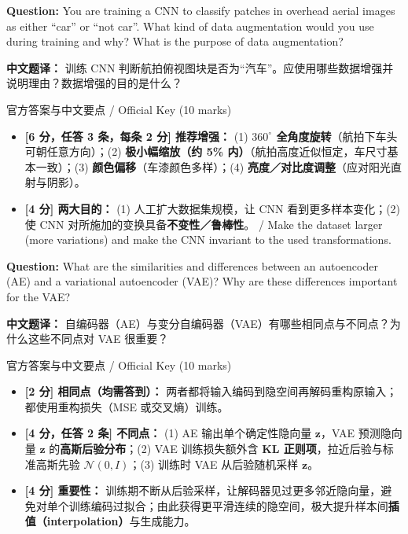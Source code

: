 \textbf{Question:} You are training a CNN to classify patches in overhead aerial images as either ``car'' or ``not car''. What kind of data augmentation would you use during training and why? What is the purpose of data augmentation?

\textbf{中文题译：} 训练 CNN 判断航拍俯视图块是否为“汽车”。应使用哪些数据增强并说明理由？数据增强的目的是什么？

\begin{StudySolution}{官方答案与中文要点 / Official Key (10 marks)}
\begin{itemize}
\item \textbf{[6 分，任答 3 条，每条 2 分] 推荐增强：} (1) \textbf{$360^\circ$ 全角度旋转}（航拍下车头可朝任意方向）；(2) \textbf{极小幅缩放（约 5\% 内）}（航拍高度近似恒定，车尺寸基本一致）；(3) \textbf{颜色偏移}（车漆颜色多样）；(4) \textbf{亮度／对比度调整}（应对阳光直射与阴影）。
\item \textbf{[4 分] 两大目的：} (1) 人工扩大数据集规模，让 CNN 看到更多样本变化；(2) 使 CNN 对所施加的变换具备\textbf{不变性／鲁棒性}。 / Make the dataset larger (more variations) and make the CNN invariant to the used transformations.
\end{itemize}
\end{StudySolution}

\textbf{Question:} What are the similarities and differences between an autoencoder (AE) and a variational autoencoder (VAE)? Why are these differences important for the VAE?

\textbf{中文题译：} 自编码器（AE）与变分自编码器（VAE）有哪些相同点与不同点？为什么这些不同点对 VAE 很重要？

\begin{StudySolution}{官方答案与中文要点 / Official Key (10 marks)}
\begin{itemize}
\item \textbf{[2 分] 相同点（均需答到）：} 两者都将输入编码到隐空间再解码重构原输入；都使用重构损失（MSE 或交叉熵）训练。
\item \textbf{[4 分，任答 2 条] 不同点：} (1) AE 输出单个确定性隐向量 $\mathbf{z}$，VAE 预测隐向量 $\mathbf{z}$ 的\textbf{高斯后验分布}；(2) VAE 训练损失额外含 \textbf{KL 正则项}，拉近后验与标准高斯先验 $\mathcal{N}(0,I)$；(3) 训练时 VAE 从后验随机采样 $\mathbf{z}$。
\item \textbf{[4 分] 重要性：} 训练期不断从后验采样，让解码器见过更多邻近隐向量，避免对单个训练编码过拟合；由此获得更平滑连续的隐空间，极大提升样本间\textbf{插值（interpolation）}与生成能力。
\end{itemize}
\end{StudySolution}

